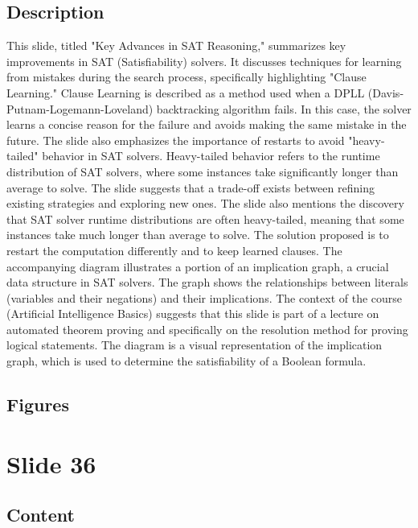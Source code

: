\documentclass{article}%
\begin{document}
\subsection{Description}%
This slide, titled "Key Advances in SAT Reasoning," summarizes key improvements in SAT (Satisfiability) solvers.  It discusses techniques for learning from mistakes during the search process, specifically highlighting "Clause Learning."  Clause Learning is described as a method used when a DPLL (Davis-Putnam-Logemann-Loveland) backtracking algorithm fails.  In this case, the solver learns a concise reason for the failure and avoids making the same mistake in the future.  The slide also emphasizes the importance of restarts to avoid "heavy-tailed" behavior in SAT solvers.  Heavy-tailed behavior refers to the runtime distribution of SAT solvers, where some instances take significantly longer than average to solve.  The slide suggests that a trade-off exists between refining existing strategies and exploring new ones.  The slide also mentions the discovery that SAT solver runtime distributions are often heavy-tailed, meaning that some instances take much longer than average to solve.  The solution proposed is to restart the computation differently and to keep learned clauses.  The accompanying diagram illustrates a portion of an implication graph, a crucial data structure in SAT solvers.  The graph shows the relationships between literals (variables and their negations) and their implications.  The context of the course (Artificial Intelligence Basics) suggests that this slide is part of a lecture on automated theorem proving and specifically on the resolution method for proving logical statements.  The diagram is a visual representation of the implication graph, which is used to determine the satisfiability of a Boolean formula.%
\subsection{Figures}%
\begin{figure}[H]%
\centering%
\end{figure}

%
\newpage%
\section{Slide 36}%
\label{sec:Slide36}%
\subsection{Content}%
\end{document}
